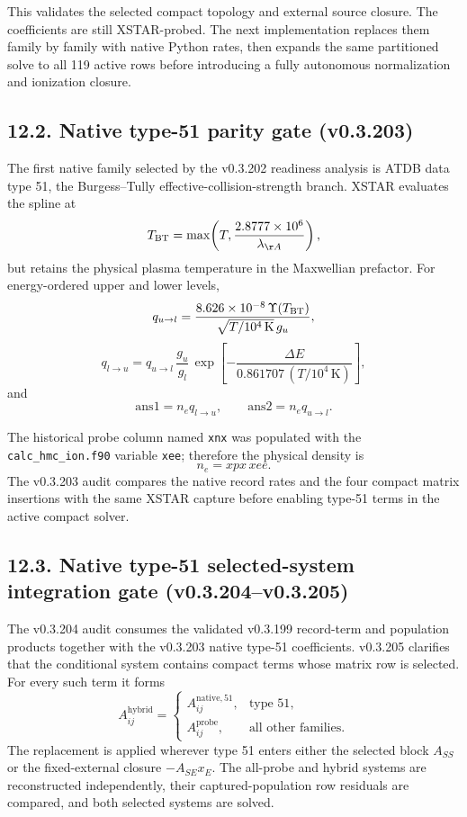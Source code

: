 \documentclass[
  10pt,
]{article}
\begin{document}
This validates the selected compact topology and external source closure. The coefficients are still XSTAR-probed. The next implementation replaces them family by family with native Python rates, then expands the same partitioned solve to all 119 active rows before introducing a fully autonomous normalization and ionization closure.

\subsection{12.2. Native type-51 parity gate (v0.3.203)}

The first native family selected by the v0.3.202 readiness analysis is ATDB data type 51, the Burgess--Tully effective-collision-strength branch. XSTAR evaluates the spline at
\[
T_{\rm BT}=\max\!\left(T,\frac{2.8777\times10^6}{\lambda_{\AA}}\right),
\]
but retains the physical plasma temperature in the Maxwellian prefactor. For energy-ordered upper and lower levels,
\[
q_{u\rightarrow l}=\frac{8.626\times10^{-8}\,\Upsilon(T_{\rm BT})}{\sqrt{T/10^4\,\mathrm{K}}\,g_u},
\]
\[
q_{l\rightarrow u}=q_{u\rightarrow l}\,\frac{g_u}{g_l}\,
\exp\!\left[-\frac{\Delta E}{0.861707\,(T/10^4\,\mathrm{K})}\right],
\]
and
\[
\mathrm{ans1}=n_e q_{l\rightarrow u},\qquad
\mathrm{ans2}=n_e q_{u\rightarrow l}.
\]

The historical probe column named \texttt{xnx} was populated with the
\texttt{calc\_hmc\_ion.f90} variable \texttt{xee}; therefore the physical density is
\[
n_e=xpx\,xee.
\]
The v0.3.203 audit compares the native record rates and the four compact matrix insertions with the same XSTAR capture before enabling type-51 terms in the active compact solver.

\subsection{12.3. Native type-51 selected-system integration gate (v0.3.204--v0.3.205)}

The v0.3.204 audit consumes the validated v0.3.199 record-term and population products together with the v0.3.203 native type-51 coefficients. v0.3.205 clarifies that the conditional system contains compact terms whose matrix row is selected. For every such term it forms
\begin{equation}
A^{\mathrm{hybrid}}_{ij}=\begin{cases}
A^{\mathrm{native,51}}_{ij}, & \text{type 51},\\
A^{\mathrm{probe}}_{ij}, & \text{all other families}.
\end{cases}
\end{equation}
The replacement is applied wherever type 51 enters either the selected block $A_{SS}$ or the fixed-external closure $-A_{SE}x_E$. The all-probe and hybrid systems are reconstructed independently, their captured-population row residuals are compared, and both selected systems are solved.
\end{document}
